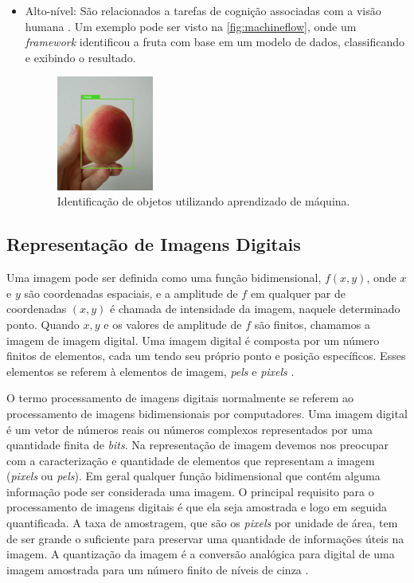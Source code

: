 \begin{itemize}
\item Alto-nível:
São relacionados a tarefas de cognição associadas com a visão humana \cite{marengoni:2009}. Um exemplo pode ser visto na \autoref{fig:machineflow}, onde um \textit{framework} identificou a fruta com base em um modelo de dados, classificando e exibindo o resultado.
       \begin{figure}[ht]
	\caption{\label{fig:machineflow}Identificação de objetos utilizando aprendizado de máquina.}
	\begin{center}
	    \includegraphics[width=0.3\textwidth]{peachs/tensorflow}
	\end{center}
\end{figure}
	
\end{itemize} 


\subsection{Representação de Imagens Digitais}
Uma imagem pode ser definida como uma função bidimensional, $f(x,y)$, onde $x$ e $y$ são coordenadas espaciais, e a amplitude de $f$ em qualquer par de coordenadas $(x,y)$ é chamada de intensidade da imagem, naquele determinado ponto. Quando $x,y$ e os valores de amplitude de $f$ são finitos, chamamos a imagem de imagem digital. Uma imagem digital é composta por um número finitos de elementos, cada um tendo seu próprio ponto e posição específicos. Esses elementos se referem à elementos de imagem, \textit{pels} e \textit{pixels} \cite{gonzalez1992digital}. 

O termo processamento de imagens digitais normalmente se referem ao processamento de imagens bidimensionais por computadores. Uma imagem digital é um vetor de números reais ou números complexos representados por uma quantidade finita de \textit{bits}.
Na representação de imagem devemos nos preocupar com a caracterização e quantidade de elementos que representam a imagem (\textit{pixels} ou \textit{pels}). Em geral qualquer função bidimensional que contém alguma informação pode ser considerada uma imagem. O principal requisito para o processamento de imagens digitais é que ela seja amostrada e logo em seguida quantificada. A taxa de amostragem, que são os \textit{pixels} por unidade de área, tem de ser grande o suficiente para preservar uma quantidade de informações úteis na imagem. A quantização da imagem é a conversão analógica para digital de uma imagem amostrada para um número finito de níveis de cinza \cite{jain1989fundamentals}.

